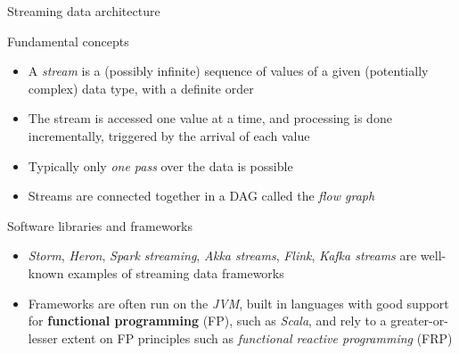 \begin{frame}{Streaming data architecture}
\protect\hypertarget{streaming-data-architecture}{}

\begin{block}{Fundamental concepts}

\begin{itemize}
\tightlist
\item
  A \emph{stream} is a (possibly infinite) sequence of values of a given
  (potentially complex) data type, with a definite order
\item
  The stream is accessed one value at a time, and processing is done
  incrementally, triggered by the arrival of each value
\item
  Typically only \emph{one pass} over the data is possible
\item
  Streams are connected together in a DAG called the \emph{flow graph}
\end{itemize}

\end{block}

\begin{block}{Software libraries and frameworks}

\begin{itemize}
\tightlist
\item
  \emph{Storm}, \emph{Heron}, \emph{Spark streaming}, \emph{Akka
  streams}, \emph{Flink}, \emph{Kafka streams} are well-known examples
  of streaming data frameworks
\item
  Frameworks are often run on the \emph{JVM}, built in languages with
  good support for \textbf{functional programming} (FP), such as
  \emph{Scala}, and rely to a greater-or-lesser extent on FP principles
  such as \emph{functional reactive programming} (FRP)
\end{itemize}

\end{block}

\end{frame}

